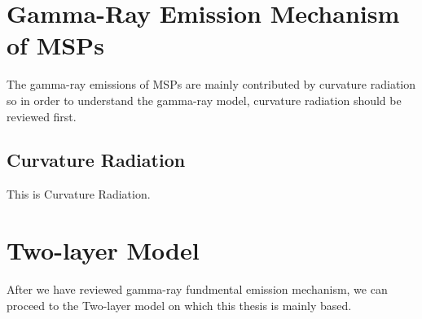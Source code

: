 \documentclass[12pt]{report}
\begin{document}
      \section{Gamma-Ray Emission Mechanism of MSPs}
          The gamma-ray emissions of MSPs are mainly contributed by curvature 
          radiation so in order to understand the gamma-ray model, curvature radiation 
          should be reviewed first. 
          
          \subsection{Curvature Radiation}
              This is Curvature Radiation.

      \section{Two-layer Model}
          After we have reviewed gamma-ray fundmental emission mechanism, we can proceed to
          the Two-layer model on which this thesis is mainly based. 
        
\end{document}
